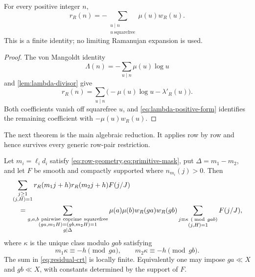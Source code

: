 \begin{theorem}
\label{thm:residual-divisor}
For every positive integer \(n\),
\begin{equation}
 \boxed{\quad
 r_R(n)=-\sum_{\substack{u\mid n\\u\ \mathrm{squarefree}}}
 \mu(u)w_R(u).
 \quad}
 \label{eq:residual-divisor}
\end{equation}
This is a finite identity; no limiting Ramanujan expansion is used.
\end{theorem}

\begin{proof}
The von Mangoldt identity
\[
 \Lambda(n)=-\sum_{u\mid n}\mu(u)\log u
\]
and \cref{lem:lambda-divisor} give
\[
 r_R(n)=\sum_{u\mid n}
 \bigl(-\mu(u)\log u-\lambda'_R(u)\bigr).
\]
Both coefficients vanish off squarefree \(u\), and
\eqref{eq:lambda-positive-form} identifies the remaining coefficient
with \(-\mu(u)w_R(u)\).
\end{proof}

The next theorem is the main algebraic reduction.  It applies row by
row and hence survives every generic row-pair restriction.

\begin{theorem}
\label{thm:residual-crt}
Let \(m_i=\ell_i d_i\) satisfy \cref{eq:row-geometry,eq:primitive-mask},
put \(\Delta=m_1-m_2\), and let \(F\) be smooth and compactly supported
where \(n_{m_i}(j)>0\).  Then
\begin{align}
 &\sum_{\substack{j\ge1\\(j,H)=1}}
 r_R(m_1j+h)r_R(m_2j+h)F(j/J)
 \notag\\
 &\quad=
 \sum_{\substack{g,a,b\ \mathrm{pairwise\ coprime\ squarefree}\\
 (ga,m_1H)=(gb,m_2H)=1\\g\mid\Delta}}
 \mu(a)\mu(b)w_R(ga)w_R(gb)
 \sum_{\substack{j\equiv\kappa\ (\bmod\,gab)\\(j,H)=1}}
 F(j/J),
 \label{eq:residual-crt}
\end{align}
where \(\kappa\) is the unique class modulo \(gab\) satisfying
\begin{equation}
 m_1\kappa\equiv-h\pmod{ga},
 \qquad
 m_2\kappa\equiv-h\pmod{gb}.
 \label{eq:kappa-system}
\end{equation}
The sum in \eqref{eq:residual-crt} is locally finite.  Equivalently one
may impose \(ga\ll X\) and \(gb\ll X\), with constants determined by
the support of \(F\).
\end{theorem}

